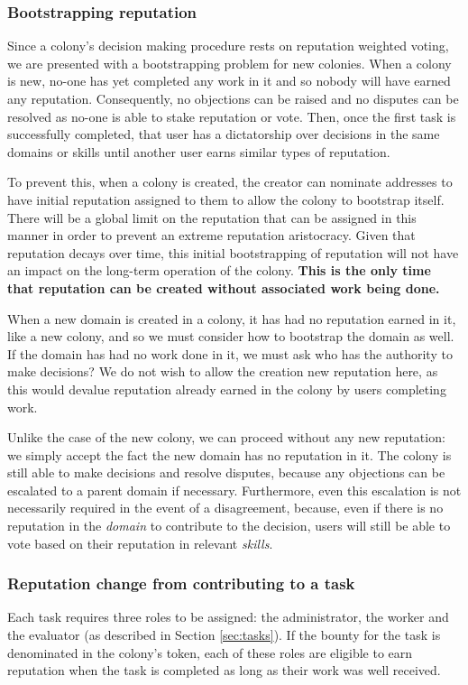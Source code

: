 \subsubsection{Bootstrapping reputation}\label{sec:bootstrapping-rep}
Since a colony's decision making procedure rests on reputation weighted voting, we are presented with a bootstrapping problem for new colonies. When a colony is new, no-one has yet completed any work in it and so nobody will have earned any reputation. Consequently, no objections can be raised and no disputes can be resolved as no-one is able to stake reputation or vote. Then, once the first task is successfully completed, that user has a dictatorship over decisions in the same domains or skills until another user earns similar types of reputation.

To prevent this, when a colony is created, the creator can nominate addresses to have initial reputation assigned to them to allow the colony to bootstrap itself. There will be a global limit on the reputation that can be assigned in this manner in order to prevent an extreme reputation aristocracy. Given that reputation decays over time, this initial bootstrapping of reputation will not have an impact on the long-term operation of the colony. \textbf{This is the only time that reputation can be created without associated work being done.}

When a new domain is created in a colony, it has had no reputation earned in it, like a new colony, and so we must consider how to bootstrap the domain as well. If the domain has had no work done in it, we must ask who has the authority to make decisions? We do not wish to allow the creation new reputation here, as this would devalue reputation already earned in the colony by users completing work. 

Unlike the case of the new colony, we can proceed without any new reputation: we simply accept the fact the new domain has no reputation in it. The colony is still able to make decisions and resolve disputes, because any objections can be escalated to a parent domain if necessary. Furthermore, even this escalation is not necessarily required in the event of a disagreement, because, even if there is no reputation in the \emph{domain} to contribute to the decision, users will still be able to vote based on their reputation in relevant \emph{skills}.

\subsubsection{Reputation change from contributing to a task}\label{sec:earning-rep-from-task}
Each task requires three roles to be assigned: the administrator, the worker and the evaluator (as described in Section \ref{sec:tasks}). If the bounty for the task is denominated in the colony's token, each of these roles are eligible to earn reputation when the task is completed as long as their work was well received. %

